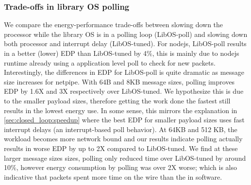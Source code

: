 
\subsubsection{Trade-offs in library OS polling}
\label{sec:closed_loop:poll}
We compare the energy-performance trade-offs between slowing down the processor while the library OS is in a polling loop (LibOS-poll) and slowing down both processor and interrupt delay (LibOS-tuned). For nodejs, LibOS-poll results in a better (lower) EDP than LibOS-tuned by 4\%, this is mainly due to nodejs runtime already using a application level poll to check for new packets. Interestingly, the differences in EDP for LibOS-poll is quite dramatic as message size increases for netpipe. With 64B and 8KB message sizes, polling improves EDP by 1.6X and 3X respectively over LibOS-tuned. We hypothesize this is due to the smaller payload sizes, therefore getting the work done the fastest still results in the lowest energy use. In some sense, this mirrors the explanation in \cref{sec:closed_loop:speedup} where the best EDP for smaller payload sizes uses fast interrupt delays (an interrupt-based poll behavior). At 64KB and 512 KB, the workload becomes more network bound and our results indicate polling actually results in worse EDP by up to 2X compared to LibOS-tuned. We find at these larger message sizes sizes, polling only reduced time over LibOS-tuned by around 10\%, however energy consumption by polling was over 2X worse; which is also indicative that packets spent more time on the wire than the in software.

